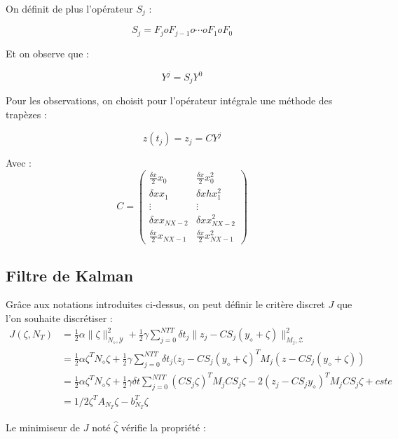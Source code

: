 \documentclass[a4paper]{article}
\begin{document}
On définit de plus l'opérateur $S_j$ :

\[ S_j = F_j o F_{j-1} o \cdots o F_1 o F_0 \]

Et on observe que :

\[ Y^j= S_j Y^0\]

Pour les observations, on choisit pour l'opérateur intégrale une méthode des trapèzes :

\[ z(t_j) = z_j = CY^j\]

Avec :
\[
C =  \left( \begin{array}{cc}
	\frac{\delta x}{2} x_0       &  \frac{\delta x}{2}x_0^2   \\
	\delta x x_1       &  \delta xh x_1^2   \\
	\vdots      & \vdots     \\
	\delta x x_{NX-2}  & \delta xx_{NX-2}^2\\
    \frac{\delta x}{2} x_{NX-1}  & \frac{\delta x}{2} x_{NX-1}^2
	 \end{array} \right)
\]


\subsection{Filtre de Kalman}

Grâce aux notations introduites ci-dessus, on peut définir le critère discret $J$ que l'on souhaite discrétiser :
\[
\begin{split}
    J(\zeta,N_T) &= \frac{1}{2}\alpha \parallel \zeta \parallel _{N_{\diamond},\mathscr{Y}}^2 + \frac{1}{2}\gamma \sum_{j=0}^{NTT} \delta t_j \parallel z_j - CS_j(y_{\diamond}+\zeta) \parallel_{M_j,\mathscr{Z}}^2 \\
	                 &= \frac{1}{2}\alpha \zeta ^T N_{\diamond} \zeta + \frac{1}{2}\gamma \sum_{j=0}^{NTT} \delta t_j (z_j - CS_j(y_{\diamond}+\zeta)^T M_j (z - CS_j(y_{\diamond}+\zeta))\\
					 &=  \frac{1}{2}\alpha \zeta ^T N_{\diamond} \zeta + \frac{1}{2}\gamma \delta t \sum_{j=0}^{NTT} (C S_j\zeta)^T M_jCS_j\zeta
			            -2(z_j-CS_jy_{\diamond})^TM_jCS_j \zeta + cste\\
					 &= 1/2 \zeta^T A_{N_T} \zeta - b_{N_T}^T\zeta
\end{split}
\]

Le minimiseur de $J$ noté $\hat{\zeta}$ vérifie la propriété :
\end{document}
